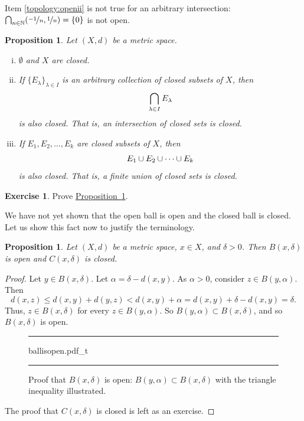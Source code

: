 \documentclass[12pt,openany]{book}
\newcommand{\avoidbreak}{\postdisplaypenalty=100}
\newcommand{\N}{{\mathbb{N}}}
\theoremstyle{plain}
\newtheorem{prop}[thm]{Proposition}
\theoremstyle{remark}
\theoremstyle{definition}
\newenvironment{exbox}{%
    \def\FrameCommand{\vrule width 1pt \relax\hspace{10pt}}%
    \MakeFramed{\advance\hsize-\width\FrameRestore}%
}{%
    \endMakeFramed
}
\newenvironment{myfig}{%
\begin{figure}[h!t]
\noindent\rule{\textwidth}{0.5pt}\vspace{12pt}\par\centering}%
{\par\noindent\rule{\textwidth}{0.5pt}
\end{figure}}
\theoremstyle{exercise}
\newtheorem{exercise}{Exercise}[section]
\theoremstyle{example}
\newcommand{\propref}[1]{\hyperref[#1]{Proposition~\ref*{#1}}}
\begin{document}
Item \ref{topology:openii} is not true for an arbitrary intersection:
$\bigcap_{n \in \N} (\nicefrac{-1}{n},\nicefrac{1}{n}) = \{ 0
\}$ is not open.

\begin{prop} \label{prop:topology:closed}
Let $(X,d)$ be a metric space.
\begin{enumerate}[(i)]
\item \label{topology:closedi} $\emptyset$ and $X$ are closed.
\item \label{topology:closedii} If $\{ E_\lambda \}_{\lambda \in I}$ is
an arbitrary collection of closed subsets of $X$, then
\begin{equation*}
\bigcap_{\lambda \in I} E_\lambda
\avoidbreak
\end{equation*}
is also closed.  That is, an intersection of closed sets is closed.
\item \label{topology:closediii} If $E_1, E_2, \ldots, E_k$ are closed
subsets of $X$, then
\begin{equation*}
E_1 \cup E_2 \cup \cdots \cup E_k
\avoidbreak
\end{equation*}
is also closed.  That is, a finite union of closed sets is closed.
\end{enumerate}
\end{prop}

\begin{exbox}
\begin{exercise}
Prove \propref{prop:topology:closed}.
\end{exercise}
\end{exbox}

We have not yet shown that the open ball is open and the closed ball is
closed.  Let us show this fact now to justify the terminology.

\begin{prop} \label{prop:topology:ballsopenclosed}
Let $(X,d)$ be a metric space, $x \in X$, and $\delta > 0$.  Then
$B(x,\delta)$ is open and 
$C(x,\delta)$ is closed.
\end{prop}

\begin{proof}
Let $y \in B(x,\delta)$.  Let $\alpha = \delta-d(x,y)$.  As $\alpha
> 0$, consider $z \in B(y,\alpha)$.  Then
\begin{equation*}
d(x,z) \leq d(x,y) + d(y,z) < d(x,y) + \alpha = d(x,y) + \delta-d(x,y) =
\delta .
\end{equation*}
Thus, $z \in B(x,\delta)$ for every $z \in B(y,\alpha)$.
So $B(y,\alpha) \subset B(x,\delta)$,
and so $B(x,\delta)$ is open.

\begin{myfig}
{ballisopen.pdf_t}
\caption{Proof that $B(x,\delta)$ is open: $B(y,\alpha) \subset
B(x,\delta)$ with the triangle inequality illustrated.\label{fig:ballisopen}}
\end{myfig}

The proof that $C(x,\delta)$ is closed is left as an exercise.
\end{proof}
\end{document}
